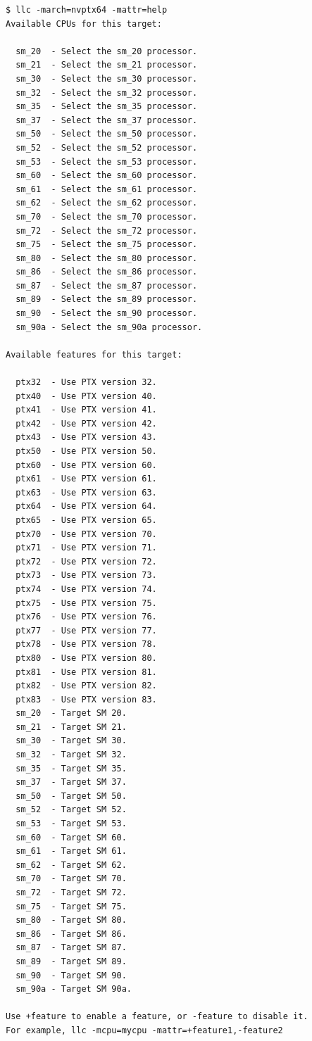 \begin{lstlisting}[style=ir]
$ llc -march=nvptx64 -mattr=help
Available CPUs for this target:

  sm_20  - Select the sm_20 processor.
  sm_21  - Select the sm_21 processor.
  sm_30  - Select the sm_30 processor.
  sm_32  - Select the sm_32 processor.
  sm_35  - Select the sm_35 processor.
  sm_37  - Select the sm_37 processor.
  sm_50  - Select the sm_50 processor.
  sm_52  - Select the sm_52 processor.
  sm_53  - Select the sm_53 processor.
  sm_60  - Select the sm_60 processor.
  sm_61  - Select the sm_61 processor.
  sm_62  - Select the sm_62 processor.
  sm_70  - Select the sm_70 processor.
  sm_72  - Select the sm_72 processor.
  sm_75  - Select the sm_75 processor.
  sm_80  - Select the sm_80 processor.
  sm_86  - Select the sm_86 processor.
  sm_87  - Select the sm_87 processor.
  sm_89  - Select the sm_89 processor.
  sm_90  - Select the sm_90 processor.
  sm_90a - Select the sm_90a processor.

Available features for this target:

  ptx32  - Use PTX version 32.
  ptx40  - Use PTX version 40.
  ptx41  - Use PTX version 41.
  ptx42  - Use PTX version 42.
  ptx43  - Use PTX version 43.
  ptx50  - Use PTX version 50.
  ptx60  - Use PTX version 60.
  ptx61  - Use PTX version 61.
  ptx63  - Use PTX version 63.
  ptx64  - Use PTX version 64.
  ptx65  - Use PTX version 65.
  ptx70  - Use PTX version 70.
  ptx71  - Use PTX version 71.
  ptx72  - Use PTX version 72.
  ptx73  - Use PTX version 73.
  ptx74  - Use PTX version 74.
  ptx75  - Use PTX version 75.
  ptx76  - Use PTX version 76.
  ptx77  - Use PTX version 77.
  ptx78  - Use PTX version 78.
  ptx80  - Use PTX version 80.
  ptx81  - Use PTX version 81.
  ptx82  - Use PTX version 82.
  ptx83  - Use PTX version 83.
  sm_20  - Target SM 20.
  sm_21  - Target SM 21.
  sm_30  - Target SM 30.
  sm_32  - Target SM 32.
  sm_35  - Target SM 35.
  sm_37  - Target SM 37.
  sm_50  - Target SM 50.
  sm_52  - Target SM 52.
  sm_53  - Target SM 53.
  sm_60  - Target SM 60.
  sm_61  - Target SM 61.
  sm_62  - Target SM 62.
  sm_70  - Target SM 70.
  sm_72  - Target SM 72.
  sm_75  - Target SM 75.
  sm_80  - Target SM 80.
  sm_86  - Target SM 86.
  sm_87  - Target SM 87.
  sm_89  - Target SM 89.
  sm_90  - Target SM 90.
  sm_90a - Target SM 90a.

Use +feature to enable a feature, or -feature to disable it.
For example, llc -mcpu=mycpu -mattr=+feature1,-feature2
\end{lstlisting}

